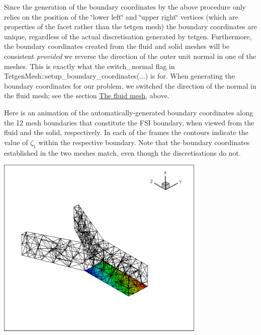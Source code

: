 \begin{DoxyEnumerate}
\end{DoxyEnumerate}Since the generation of the boundary coordinates by the above procedure only relies on the position of the \char`\"{}lower left\char`\"{} and \char`\"{}upper right\char`\"{} vertices (which are properties of the facet rather than the {\ttfamily tetgen} mesh) the boundary coordinates are unique, regardless of the actual discretisation generated by {\ttfamily tetgen}. Furthermore, the boundary coordinates created from the fluid and solid meshes will be consistent {\itshape provided} we reverse the direction of the outer unit normal in one of the meshes. This is exactly what the {\ttfamily switch\+\_\+normal} flag in {\ttfamily Tetgen\+Mesh\+::setup\+\_\+boundary\+\_\+coordinates}(...) is for. When generating the boundary coordinates for our problem, we switched the direction of the normal in the fluid mesh; see the section \hyperlink{index_fluid_mesh}{The fluid mesh}, above.

Here is an animation of the automatically-\/generated boundary coordinates along the 12 mesh boundaries that constitute the F\+SI boundary, when viewed from the fluid and the solid, respectively. In each of the frames the contours indicate the value of $ \zeta_1 $ within the respective boundary. Note that the boundary coordinates established in the two meshes match, even though the discretisations do not.

 
\begin{DoxyImage}
\includegraphics[width=0.75\textwidth]{fluid_boundary_test}
\end{DoxyImage}


